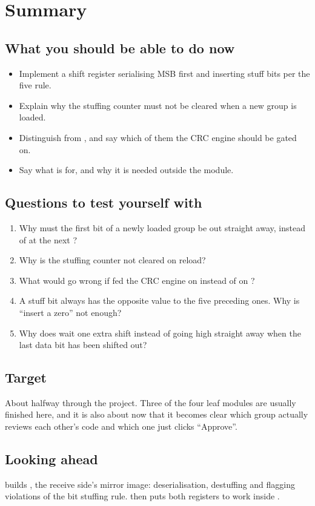 
\section{Summary}
\label{c14:sec:review}

\subsection*{What you should be able to do now}
\begin{itemize}
  \item Implement a shift register serialising MSB first and inserting stuff bits per the five rule.
  \item Explain why the stuffing counter must not be cleared when a new group is loaded.
  \item Distinguish  from , and say which of them the CRC engine
    should be gated on.
  \item Say what  is for, and why it is needed outside the module.
\end{itemize}

\subsection*{Questions to test yourself with}
\begin{enumerate}
  \item Why must the first bit of a newly loaded group be out straight away, instead of at the next
    ?
  \item Why is the stuffing counter not cleared on reload?
  \item What would go wrong if  fed the CRC engine on  instead of
    on ?
  \item A stuff bit always has the opposite value to the five preceding ones. Why is ``insert a
    zero'' not enough?
  \item Why does  wait one extra shift instead of going high straight away when the last
    data bit has been shifted out?
\end{enumerate}

\subsection*{Target}
About halfway through the project. Three of the four leaf modules are usually finished here, and it
is also about now that it becomes clear which group actually reviews each other's code and which one
just clicks ``Approve''.

\subsection*{Looking ahead}
 builds , the receive side's mirror image: deserialisation,
destuffing and flagging violations of the bit stuffing rule.  then puts both
registers to work inside .

